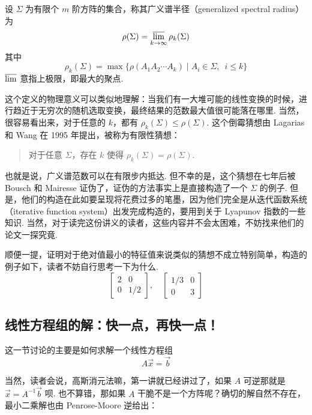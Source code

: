 \begin{definition}[广义谱半径]
    设 $\Sigma$ 为有限个 $m$ 阶方阵的集合，称其广义谱半径（generalized spectral radius）为
    \[ \rho(\Sigma) = \varlimsup_{k \to \infty} \rho_k(\Sigma) \]
    其中
    \[ \rho_k(\Sigma) = \max\{\rho(A_1A_2 \cdots A_k) \mid A_i \in \Sigma,\enspace i \leqslant k\} \]
    $\varlimsup$ 意指上极限，即最大的聚点.
\end{definition}

这个定义的物理意义可以类似地理解：当我们有一大堆可能的线性变换的时候，进行趋近于无穷次的随机选取变换，最终结果的范数最大值很可能落在哪里. 当然，很容易看出来，对于任意的 $k$，都有 $\rho_k(\Sigma) \leqslant \rho(\Sigma)$. 这个倒霉猜想由 Lagarias 和 Wang 在 1995 年提出，被称为有限性猜想：

\begin{quote}
    \kaishu
    对于任意 $\Sigma$，存在 $k$ 使得 $\rho_k(\Sigma) = \rho(\Sigma)$.
\end{quote}

也就是说，广义谱范数可以在有限步内抵达. 但不幸的是，这个猜想在七年后被 Bousch 和 Mairesse 证伪了，证伪的方法事实上是直接构造了一个 $\Sigma$ 的例子. 但是，他们的构造在此如要呈现将花费过多的笔墨，因为他们完全是从迭代函数系统（iterative function system）出发完成构造的，要用到关于 Lyapunov 指数的一些知识. 当然，对于读完这份讲义的读者，这些内容并不会太困难，不妨找来他们的论文一探究竟.

顺便一提，证明对于绝对值最小的特征值来说类似的猜想不成立特别简单，构造的例子如下，读者不妨自行思考一下为什么.
\[
    \begin{bmatrix}
        2 & 0 \\ 0 & 1/2
    \end{bmatrix}, \quad \begin{bmatrix}
        1/3 & 0 \\ 0 & 3
    \end{bmatrix}
\]

\subsection{线性方程组的解：快一点，再快一点！}

这一节讨论的主要是如何求解一个线性方程组
\[ A\vec{x} = \vec{b} \]

当然，读者会说，高斯消元法嘛，第一讲就已经讲过了，如果 $A$ 可逆那就是 $\vec{x} = A^{-1}\vec{b}$ 呗. 也不算错，那如果 $A$ 干脆不是一个方阵呢？确切的解自然不存在，最小二乘解也由 Penrose-Moore 逆给出：


